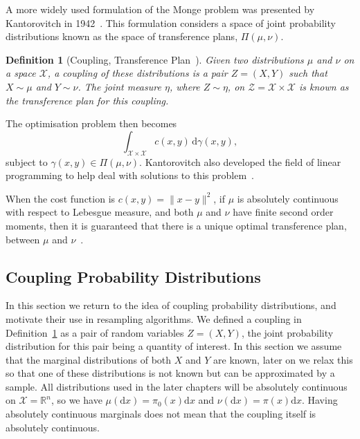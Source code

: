\documentclass[final]{siamltex}
\newtheorem{dfn}{Definition}[section]
\begin{document}
A more widely used formulation of the Monge problem was presented by Kantorovitch in
1942~\cite{kantorovitch1958translocation}. This formulation considers a space of joint probability
distributions known as the space of transference plans, $\Pi(\mu, \nu)$.

\begin{dfn}[Coupling, Transference Plan~\cite{reich2013ensemble}]\label{def:coupling}
Given two distributions $\mu$ and $\nu$ on a space $\mathcal{X}$, a coupling of these distributions
is a pair $Z = (X,Y)$ such that $X\sim\mu$ and $Y\sim\nu$. The joint measure $\eta$, where
$Z\sim\eta$, on $\mathcal{Z}=\mathcal{X}\times\mathcal{X}$ is known as the transference plan for
this coupling.
\end{dfn}

The optimisation problem then becomes
\[
	\int_{\mathcal{X}\times\mathcal{X}} \! c(x, y) \, \text{d}\gamma(x, y),
\]
subject to $\gamma(x,y) \in \Pi(\mu, \nu)$. Kantorovitch also developed the field of
linear programming to help deal with solutions to this
problem~\cite{kantorovich1960mathematical,kantorovitch1958translocation}.

When the cost function is $c(x,y) = \|x - y\|^2$, if $\mu$ is absolutely continuous with respect to
Lebesgue measure, and both $\mu$ and $\nu$ have finite second order moments, then it is guaranteed
that there is a unique optimal transference plan, between $\mu$ and $\nu$~\cite{knott1984optimal}.


\subsection{Coupling Probability Distributions}\label{sec:coupling}

In this section we return to the idea of coupling probability distributions, and motivate their use
in resampling algorithms. We defined a coupling in Definition~\ref{def:coupling} as a pair of random
variables $Z = (X,Y)$, the joint probability distribution for this pair being a quantity of
interest. In this section we assume that the marginal distributions of both $X$ and $Y$ are known,
later on we relax this so that one of these distributions is not known but can be approximated by a
sample. All distributions used in the later chapters will be absolutely continuous on $\mathcal{X} =
\mathbb{R}^n$, so we have $\mu(\text{d}x) = \pi_0(x)\text{d}x$ and $\nu(\text{d}x) =
\pi(x)\text{d}x$. Having absolutely continuous marginals does not mean that the coupling itself is
absolutely continuous.
\end{document}
